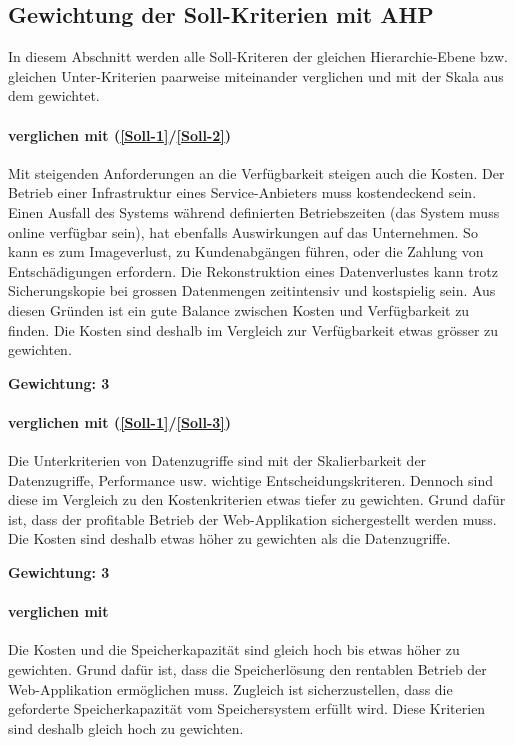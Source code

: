 \subsection{Gewichtung der Soll-Kriterien mit AHP}

In diesem Abschnitt werden alle Soll-Kriteren der gleichen Hierarchie-Ebene bzw. gleichen Unter-Kriterien paarweise miteinander verglichen und mit der Skala  aus dem  gewichtet.

\paragraph*{ verglichen mit  (\ref{Soll-1}/\ref{Soll-2})} 
Mit steigenden Anforderungen an die Verfügbarkeit steigen auch die Kosten. Der Betrieb einer Infrastruktur eines Service-Anbieters muss kostendeckend sein. Einen Ausfall des Systems während definierten Betriebszeiten (das System muss online verfügbar sein), hat ebenfalls Auswirkungen auf das Unternehmen. So kann es zum Imageverlust, zu Kundenabgängen führen, oder die Zahlung von Entschädigungen erfordern. Die Rekonstruktion eines Datenverlustes kann trotz Sicherungskopie bei grossen Datenmengen zeitintensiv und kostspielig sein. Aus diesen Gründen ist ein gute Balance zwischen Kosten und Verfügbarkeit zu finden. Die Kosten sind deshalb im Vergleich zur Verfügbarkeit etwas grösser zu gewichten.

\textbf{Gewichtung: 3}

\paragraph*{ verglichen mit  (\ref{Soll-1}/\ref{Soll-3})}
Die Unterkriterien von Datenzugriffe sind mit der Skalierbarkeit der Datenzugriffe, Performance usw. wichtige Entscheidungskriteren. Dennoch sind diese im Vergleich zu den Kostenkriterien etwas tiefer zu gewichten. Grund dafür ist, dass der profitable Betrieb der Web-Applikation sichergestellt werden muss. Die Kosten sind deshalb etwas höher zu gewichten als die Datenzugriffe.

\textbf{Gewichtung: 3}

\paragraph*{ verglichen mit }
Die Kosten und die Speicherkapazität sind gleich hoch bis etwas höher zu gewichten. Grund dafür ist, dass die Speicherlösung den rentablen Betrieb der Web-Applikation ermöglichen muss. Zugleich ist sicherzustellen, dass die geforderte Speicherkapazität vom Speichersystem erfüllt wird. Diese Kriterien sind deshalb gleich hoch zu gewichten.

